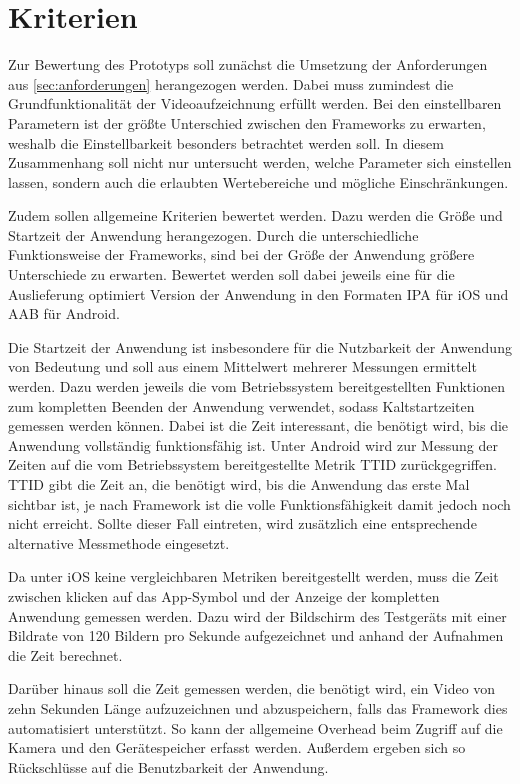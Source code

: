 \section{Kriterien}

Zur Bewertung des Prototyps soll zunächst die Umsetzung der Anforderungen aus \autoref{sec:anforderungen} herangezogen werden.
Dabei muss zumindest die Grundfunktionalität der Videoaufzeichnung erfüllt werden.
Bei den einstellbaren Parametern ist der größte Unterschied zwischen den Frameworks zu erwarten, weshalb die Einstellbarkeit besonders betrachtet werden soll.
In diesem Zusammenhang soll nicht nur untersucht werden, welche Parameter sich einstellen lassen, sondern auch die erlaubten Wertebereiche und mögliche Einschränkungen.


Zudem sollen allgemeine Kriterien bewertet werden.
Dazu werden die Größe und Startzeit der Anwendung herangezogen.
Durch die unterschiedliche Funktionsweise der Frameworks, sind bei der Größe der Anwendung größere Unterschiede zu erwarten.
Bewertet werden soll dabei jeweils eine für die Auslieferung optimiert Version der Anwendung in den Formaten \ac{IPA} für iOS und \ac{AAB} für Android.

Die Startzeit der Anwendung ist insbesondere für die Nutzbarkeit der Anwendung von Bedeutung und soll aus einem Mittelwert mehrerer Messungen ermittelt werden.
Dazu werden jeweils die vom Betriebssystem bereitgestellten Funktionen zum kompletten Beenden der Anwendung verwendet, sodass Kaltstartzeiten gemessen werden können.
Dabei ist die Zeit interessant, die benötigt wird, bis die Anwendung vollständig funktionsfähig ist.
Unter Android wird zur Messung der Zeiten auf die vom Betriebssystem bereitgestellte Metrik \ac{TTID} zurückgegriffen.
\ac{TTID} gibt die Zeit an, die benötigt wird, bis die Anwendung das erste Mal sichtbar ist, je nach Framework ist die volle Funktionsfähigkeit damit jedoch noch nicht erreicht.
Sollte dieser Fall eintreten, wird zusätzlich eine entsprechende alternative Messmethode eingesetzt.

Da unter iOS keine vergleichbaren Metriken bereitgestellt werden, muss die Zeit zwischen klicken auf das App-Symbol und der Anzeige der kompletten Anwendung gemessen werden.
Dazu wird der Bildschirm des Testgeräts mit einer Bildrate von 120 Bildern pro Sekunde aufgezeichnet und anhand der Aufnahmen die Zeit berechnet.


Darüber hinaus soll die Zeit gemessen werden, die benötigt wird, ein Video von zehn Sekunden Länge aufzuzeichnen und abzuspeichern, falls das Framework dies automatisiert unterstützt.
So kann der allgemeine Overhead beim Zugriff auf die Kamera und den Gerätespeicher erfasst werden.
Außerdem ergeben sich so Rückschlüsse auf die Benutzbarkeit der Anwendung.